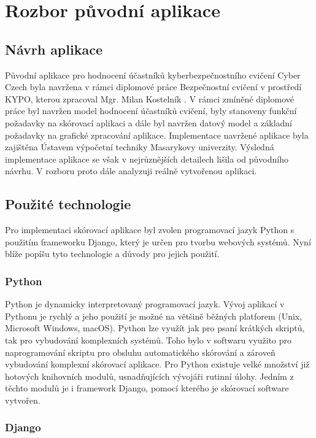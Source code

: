 \documentclass[
  digital, %
  twoside, %
  table,   %
  lof,     %
  lot,     %
]{fithesis3}
\begin{document}
\chapter{Rozbor původní aplikace}
\section{Návrh aplikace}

Původní aplikace pro hodnocení účastníků kyberbezpečnostního cvičení Cyber Czech byla navržena v rámci diplomové práce Bezpečnostní cvičení v prostředí KYPO, kterou zpracoval Mgr. Milan Kostelník \cite{Kostelnik2016thesis}. V rámci zmíněné diplomové práce byl navržen model hodnocení účastníků cvičení, byly stanoveny funkční požadavky na skórovací aplikaci a dále byl navržen datový model a základní požadavky na grafické zpracování aplikace. Implementace navržené aplikace byla zajištěna Ústavem výpočetní techniky Masarykovy univerzity. Výsledná implementace aplikace se však v nejrůznějších detailech lišila od původního návrhu. V rozboru proto dále analyzuji reálně vytvořenou aplikaci.  

\section{Použité technologie}
Pro implementaci skórovací aplikace byl zvolen programovací jazyk Python s použitím frameworku Django, který je určen pro tvorbu webových systémů. Nyní blíže popíšu tyto technologie a důvody pro jejich použití.

\subsection{Python}
Python je dynamicky interpretovaný programovací jazyk. Vývoj aplikací v Pythonu je rychlý a jeho použití je možné na většině běžných platforem (Unix, Microsoft Windows, macOS). Python lze využít jak pro psaní krátkých skriptů, tak pro vybudování komplexních systémů. Toho bylo v softwaru využito pro naprogramování skriptu pro obsluhu automatického skórování a zároveň vybudování komplexní skórovací aplikace. Pro Python existuje velké množství již hotových knihovních modulů, usnadňujících vývojáři rutinní úlohy. Jedním z těchto modulů je i framework Django, pomocí kterého je skórovací software vytvořen.

\subsection{Django}
\end{document}
